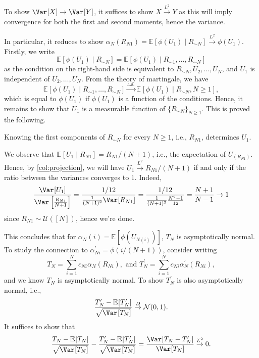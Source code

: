 \begin{note}
	To show \(\Var_{}[X] \to \Var_{}[Y] \), it suffices to show \(X \overset{L^2}{\to} Y \) as this will imply convergence for both the first and second moments, hence the variance.
\end{note}

In particular, it reduces to show \(\alpha _N(R_{N1}) = \mathbb{E}_{}[\phi (U_1) \mid R_{\sim N}] \overset{L^2}{\to} \phi (U_1)\). Firstly, we write
\[
	\mathbb{E}_{}[\phi (U_1) \mid R_{\sim N}]
	= \mathbb{E}_{}[\phi (U_1) \mid R_{\sim 1}, \dots , R_{\sim N}]
\]
as the condition on the right-hand side is equivalent to \(R_{\sim N}, U_2, \dots , U_N\), and \(U_1\) is independent of \(U_2, \dots , U_N\). From the theory of martingale, we have
\[
	\mathbb{E}_{}[\phi (U_1) \mid R_{\sim 1}, \dots , R_{\sim N}]
	\overset{\text{a.s.}}{\to} \mathbb{E}_{}[\phi (U_1) \mid R_{\sim N}, N \geq 1] ,
\]
which is equal to \(\phi (U_1)\) if \(\phi (U_1)\) is a function of the conditions. Hence, it remains to show that \(U_1\) is a measurable function of \(\{ R_{\sim N} \}_{N \geq 1}\). This is proved the following.

\begin{claim}\label{clm:lec23}
	Knowing the first components of \(R_{\sim N}\) for every \(N\geq 1\), i.e., \(R_{N1}\), determines \(U_1\).
\end{claim}
\begin{explanation}
	We observe that \(\mathbb{E}_{}[U_1 \mid R_{N1}] = R_{N1} / (N+1)\), i.e., the expectation of \(U_{(R_{N1})}\). Hence, by \autoref{col:projection}, we will have \(U_1 \overset{L^2}{\to} R_{N1} / (N+1)\) if and only if the ratio between the variances converges to \(1\). Indeed,
	\[
		\frac{\Var_{}[U_1] }{\Var_{}\left[\frac{R_{N1}}{N+1}\right] }
		= \frac{1 / 12}{\frac{1}{(N+1)^2}\Var_{}[R_{N1}] }
		= \frac{1 / 12}{\frac{1}{(N+1)^2} \frac{N^2 - 1}{12}}
		= \frac{N+1}{N - 1}
		\to 1
	\]
	since \(R_{N1} \sim \mathcal{U} ([N])\), hence we're done.
\end{explanation}

This concludes that for \(\alpha _N(i) = \mathbb{E}_{}[\phi (U_{N(i)})] \), \(T_N\) is asymptotically normal. To study the connection to \(\alpha _{Ni}^{\prime} = \phi (i / (N+1))\), consider writing
\[
	T_N = \sum_{i=1}^{N} c_{Ni} \alpha _N(R_{Ni}), \text{ and }
	T_N^{\prime} = \sum_{i=1}^{N} c_{Ni} \alpha _N^{\prime} (R_{Ni}),
\]
and we know \(T_N\) is asymptotically normal. To show \(T_N^{\prime} \) is also asymptotically normal, i.e.,
\[
	\frac{T_N^{\prime} - \mathbb{E}_{}[T_N^{\prime} ] }{\sqrt{\Var_{}[T_N] } }
	\overset{D}{\to} \mathcal{N} (0, 1).
\]
It suffices to show that
\[
	\frac{T_N - \mathbb{E}_{}[T_N] }{\sqrt{\Var_{}[T_N] } } - \frac{T_N^{\prime} - \mathbb{E}_{}[T_N^{\prime} ] }{\sqrt{\Var_{}[T_N] } }
	= \frac{\Var_{}[T_N - T_N^{\prime} ] }{\Var_{}[T_N]}
	\overset{L^2}{\to} 0.
\]

